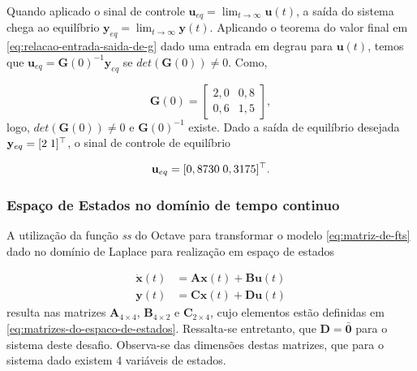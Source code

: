 Quando aplicado o sinal de controle $\mathbf{u}_{eq} = \lim_{t \rightarrow
\infty }\mathbf{u}(t)$, a saída do sistema chega ao equilíbrio $\mathbf{y}_{eq}
= \lim_{t \rightarrow \infty }\mathbf{y}(t)$. Aplicando o teorema do valor
final em \ref{eq:relacao-entrada-saida-de-g} dado uma entrada em degrau para
$\mathbf{u}(t)$, temos que $\mathbf{u}_{eq} = \mathbf{G}(0)^{-1}\mathbf{y}_{eq}$
se $det(\mathbf{G}(0)) \neq 0$. Como,

\begin{equation}
    \label{eq:ganho-estatico-de-g}
    \mathbf{G}(0)
    =
    \begin{bmatrix}
        2,0 & 0,8\\ 
        0,6 & 1,5
    \end{bmatrix},
\end{equation}logo, $det(\mathbf{G}(0)) \neq 0$ e $\mathbf{G}(0)^{-1}$ existe.
Dado a saída de equilíbrio desejada $\mathbf{y}_{eq} = [2 \thickspace
1]^\top$, o sinal de controle de equilíbrio 

\begin{equation}
    \label{eq:vetor-do-controle-de-equilibrio}
    \mathbf{u}_{eq} = [0,8730 \thickspace 0,3175]^\top.
\end{equation}

\subsubsection{Espaço de Estados no domínio de tempo continuo}
\label{subsub:espaco-de-estados-no-dominio-de-tempo-continuo}

A utilização da função \textit{ss} do Octave para transformar o modelo
\ref{eq:matriz-de-fts} dado no domínio de Laplace para realização em espaço de
estados

\begin{subequations}
    \label{eq:espaco-de-estados-continuo}
    \begin{align}
        \mathbf{\dot{x}}(t) &= \mathbf{A}\mathbf{x}(t) + \mathbf{B}\mathbf{u}(t)
        \label{eq:derivada-do-vetor-de-estados}\\
        \mathbf{y}(t) &= \mathbf{C}\mathbf{x}(t) + \mathbf{D}\mathbf{u}(t)
        \label{eq:saida-do-sistema-em-espaco-de-estados}
    \end{align}
\end{subequations} resulta nas matrizes $\mathbf{A}_{4\times 4}$,
$\mathbf{B}_{4\times 2}$ e $\mathbf{C}_{2\times 4}$, cujo elementos estão
definidas em \ref{eq:matrizes-do-espaco-de-estados}. Ressalta-se entretanto, que
$\mathbf{D} = \mathbf{\bar{0}}$ para o sistema deste desafio. Observa-se das dimensões
destas matrizes, que para o sistema dado existem 4 variáveis de estados.

